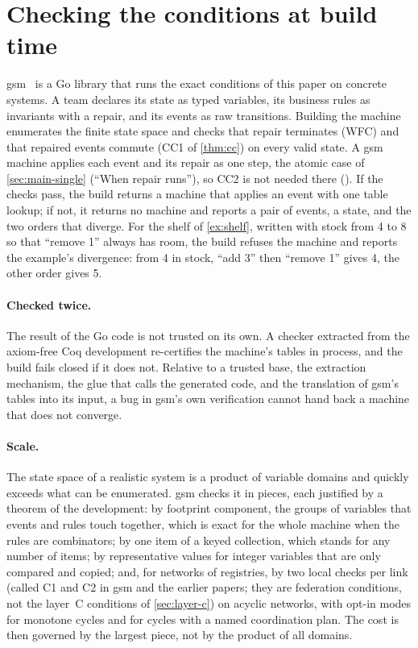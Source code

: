 
\section{Checking the conditions at build time}\label{sec:gsm}

gsm~\cite{gsm} is a Go library that runs the exact conditions of this paper on concrete systems. A
team declares its state as typed variables, its business rules as invariants with a repair, and its
events as raw transitions. Building the machine enumerates the finite state space and checks that
repair terminates (WFC) and that repaired events commute (CC1 of \cref{thm:cc}) on every valid state.
A gsm machine applies each event and its repair as one step, the atomic case of \cref{sec:main-single}
(``When repair runs''), so CC2 is not needed there (). If the checks pass, the
build returns a machine that applies an event with one table lookup; if not, it returns no machine and
reports a pair of events, a state, and the two orders that diverge. For the shelf of
\cref{ex:shelf}, written with stock from 4 to 8 so that ``remove 1'' always has room, the build
refuses the machine and reports the example's divergence: from 4 in stock, ``add 3'' then ``remove 1''
gives 4, the other order gives 5.

\paragraph{Checked twice.} The result of the Go code is not trusted on its own. A checker extracted
from the axiom-free Coq development re-certifies the machine's tables in process, and the build fails
closed if it does not. Relative to a trusted base, the extraction mechanism, the glue that calls the
generated code, and the translation of gsm's tables into its input, a bug in gsm's own verification
cannot hand back a machine that does not converge.

\paragraph{Scale.} The state space of a realistic system is a product of variable domains and quickly
exceeds what can be enumerated. gsm checks it in pieces, each justified by a theorem of the
development: by footprint component, the groups of variables that events and rules touch together,
which is exact for the whole machine when the rules are combinators; by one item of a keyed
collection, which stands for any number of items; by representative values for integer variables that
are only compared and copied; and, for networks of registries, by two local checks per link (called C1 and C2 in gsm and the earlier papers; they are federation
conditions, not the layer~C conditions of \cref{sec:layer-c})
on acyclic networks, with opt-in modes for monotone cycles and for cycles with a named coordination
plan. The cost is then governed by the largest piece, not by the product of all domains.

